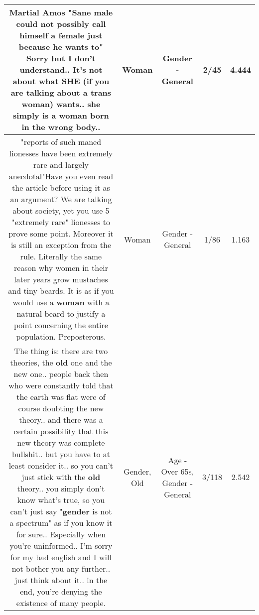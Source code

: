 \documentclass[11pt]{article}
\newlength\mylength
\begin{document}
\begin{center}
\begin{longtable}{|C{.65\mylength}|C{.30\mylength}|C{.12\mylength}|C{.12\mylength}|C{.12\mylength}|}
  \small Martial Amos "Sane male could not possibly call himself a female just because he wants to" Sorry but I don't understand.. It's not about what SHE (if you are talking about a trans \textbf{woman}) wants.. she simply is a \textbf{woman} born in the wrong body..\normalsize   & Woman & Gender - General & 2/45 & 4.444 \\  \hline
  \small "reports of such maned lionesses have been extremely rare and largely anecdotal"Have you even read the article before using it as an argument? We are talking about society, yet you use 5 "extremely rare" lionesses to prove some point. Moreover it is still an exception from the rule. Literally the same reason why women in their later years grow mustaches and tiny beards. It is as if you would use a \textbf{woman} with a natural beard to justify a point concerning the entire population. Preposterous.\normalsize   & Woman & Gender - General & 1/86 & 1.163 \\  \hline
  \small The thing is: there are two theories, the \textbf{old} one and the new one.. people back then who were constantly told that the earth was flat were of course doubting the new theory.. and there was a certain possibility that this new theory was complete bullshit.. but you have to at least consider it.. so you can't just stick with the \textbf{old} theory.. you simply don't know what's true, so you can't just say "\textbf{gender} is not a spectrum" as if you know it for sure.. Especially when you're uninformed.. I'm sorry for my bad english and I will not bother you any further.. just think about it.. in the end, you're denying the existence of many people.\normalsize   & Gender, Old & Age - Over 65s, Gender - General & 3/118 & 2.542 \\  \hline

\end{longtable}
\end{center}
\end{document}
